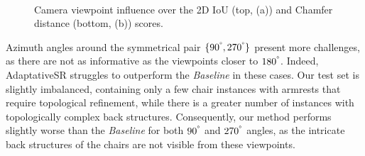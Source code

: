 \begin{figure}[h!]
  \centering
   \\
  \caption{Camera viewpoint influence over the 2D IoU (top, (a)) and Chamfer distance (bottom, (b)) scores.} \label{fig:pruning_viewpoint_influence}
\end{figure}

Azimuth angles around the symmetrical pair $\{90^{\degree}, 270^{\degree}\}$ present more challenges, as there are not as informative as the viewpoints closer to $180^{\degree}$. Indeed, AdaptativeSR struggles to outperform the \textit{Baseline} in these cases. Our test set is slightly imbalanced, containing only a few chair instances with armrests that require topological refinement, while there is a greater number of instances with topologically complex back structures. Consequently, our method performs slightly worse than the \textit{Baseline} for both $90^{\degree}$ and $270^{\degree}$ angles, as the intricate back structures of the chairs are not visible from these viewpoints. 

